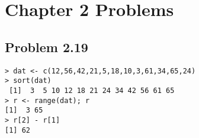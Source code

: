 \section{Chapter 2 Problems}
\graphicspath{{figures/chapter2/}}
\subsection{Problem 2.19}
\begin{lstlisting}
> dat <- c(12,56,42,21,5,18,10,3,61,34,65,24)
> sort(dat)
 [1]  3  5 10 12 18 21 24 34 42 56 61 65
> r <- range(dat); r
[1]  3 65
> r[2] - r[1]
[1] 62
\end{lstlisting}
